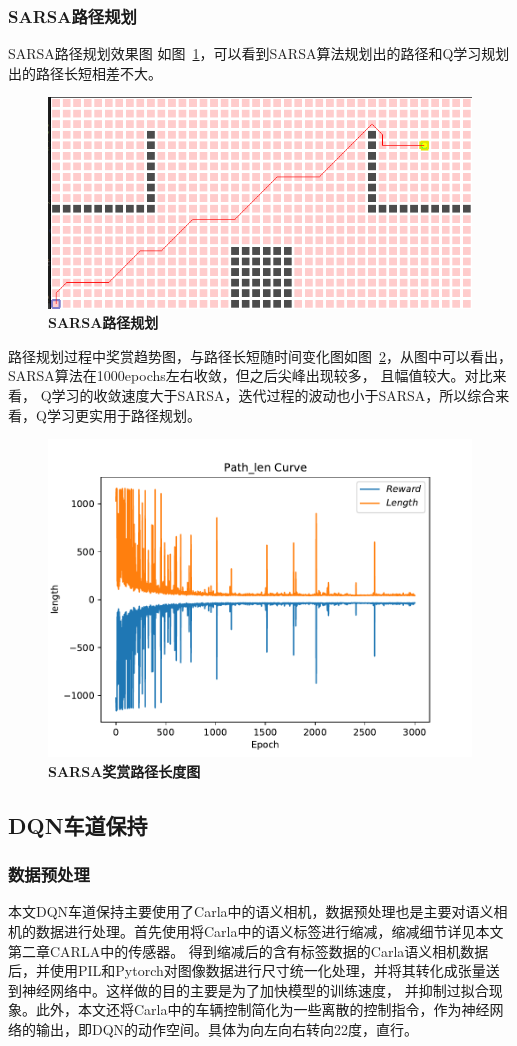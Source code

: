 \subsubsection{SARSA路径规划}
SARSA路径规划效果图
如图~\ref{fig:4-3}，可以看到SARSA算法规划出的路径和Q学习规划出的路径长短相差不大。
\begin{figure}[H]
  \centering
  \includegraphics[width=0.8\linewidth]{fig/sarsa1.png}
  \caption{\textbf{SARSA路径规划}}
  \label{fig:4-3}
\end{figure}
路径规划过程中奖赏趋势图，与路径长短随时间变化图如图~\ref{fig:4-4}，从图中可以看出，SARSA算法在1000epochs左右收敛，但之后尖峰出现较多，
且幅值较大。对比来看，
Q学习的收敛速度大于SARSA，迭代过程的波动也小于SARSA，所以综合来看，Q学习更实用于路径规划。
\begin{figure}[H]
  \centering
  \includegraphics[width=0.8\linewidth]{fig/sarsa_path_length.pdf}
  \caption{\textbf{SARSA奖赏路径长度图}}
  \label{fig:4-4}
\end{figure}

\subsection{DQN车道保持}
\subsubsection{数据预处理}
本文DQN车道保持主要使用了Carla中的语义相机，数据预处理也是主要对语义相机的数据进行处理。首先使用将Carla中的语义标签进行缩减，缩减细节详见本文第二章CARLA中的传感器。
得到缩减后的含有标签数据的Carla语义相机数据后，并使用PIL和Pytorch对图像数据进行尺寸统一化处理，并将其转化成张量送到神经网络中。这样做的目的主要是为了加快模型的训练速度，
并抑制过拟合现象。此外，本文还将Carla中的车辆控制简化为一些离散的控制指令，作为神经网络的输出，即DQN的动作空间。具体为向左向右转向22度，直行。
